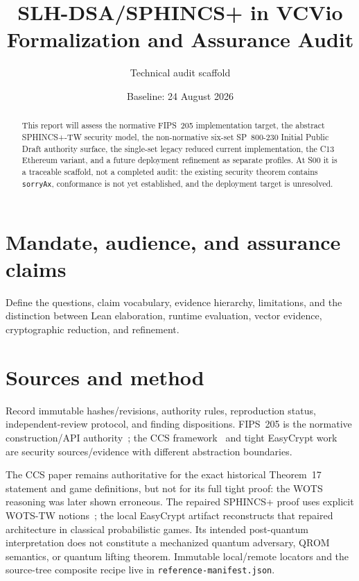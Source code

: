 \documentclass[11pt]{article}
\title{SLH-DSA/SPHINCS+ in VCVio\\Formalization and Assurance Audit}
\author{Technical audit scaffold}
\date{Baseline: 24 August 2026}
\begin{document}
\maketitle

\begin{abstract}
This report will assess the normative FIPS~205 implementation target, the abstract SPHINCS+-TW
security model, the non-normative six-set SP~800-230 Initial Public Draft authority surface, the
single-set legacy reduced current implementation, the C13 Ethereum variant, and a
future deployment refinement as separate profiles. At S00 it is a traceable scaffold, not a
completed audit: the existing security theorem contains \texttt{sorryAx}, conformance is not yet
established, and the deployment target is unresolved.
\end{abstract}

\tableofcontents

\section{Mandate, audience, and assurance claims}
Define the questions, claim vocabulary, evidence hierarchy, limitations, and the distinction between
Lean elaboration, runtime evaluation, vector evidence, cryptographic reduction, and refinement.

\section{Sources and method}
Record immutable hashes/revisions, authority rules, reproduction status, independent-review protocol,
and finding dispositions. FIPS~205 is the normative construction/API authority~\cite{fips205}; the
CCS framework~\cite{sphincsFramework2019} and tight EasyCrypt work~\cite{tightSphincsEC} are security
sources/evidence with different abstraction boundaries.

The CCS paper remains authoritative for the exact historical Theorem~17 statement and game
definitions, but not for its full tight proof: the WOTS reasoning was later shown erroneous. The
repaired SPHINCS+ proof uses explicit WOTS-TW notions~\cite{hulsingKudinov2022}; the local EasyCrypt
artifact reconstructs that repaired architecture in classical probabilistic games. Its intended
post-quantum interpretation does not constitute a mechanized quantum adversary, QROM semantics, or
quantum lifting theorem. Immutable local/remote locators and the source-tree composite recipe live in
\texttt{reference-manifest.json}.
\end{document}

